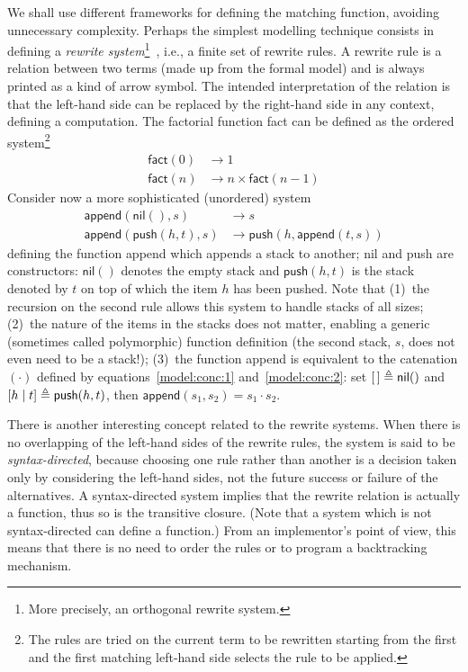 We shall use different frameworks for defining the matching function,
avoiding unnecessary complexity. Perhaps the simplest modelling
technique consists in defining a \emph{rewrite system}\footnote{More
precisely, an orthogonal rewrite system.}~\cite{HTCS:1990}, i.e., a
finite set of rewrite rules. A rewrite rule is a relation between two
terms (made up from the formal model) and is always printed as a kind
of arrow symbol. The intended interpretation of the relation is that
the left\hyp{}hand side can be replaced by the right\hyp{}hand side in
any context, defining a computation. The factorial function
\textsf{fact} can be defined as the ordered system\footnote{The rules
are tried on the current term to be rewritten starting from the first
and the first matching left\hyp{}hand side selects the rule to be
applied.}
\begin{align*}
\textsf{fact}(0) &\rightarrow 1\\
\textsf{fact}(n) &\rightarrow n \times \textsf{fact}(n-1)
\end{align*}
Consider now a more sophisticated (unordered) system
\begin{align*}
\textsf{append}(\textsf{nil}(), s) &\rightarrow s\\
\textsf{append}(\textsf{push}(h,t), s) &\rightarrow
\textsf{push}(h, \textsf{append}(t, s))
\end{align*}
defining the function \textsf{append} which appends a stack to
another; \textsf{nil} and \textsf{push} are constructors:
\(\textsf{nil}()\) denotes the empty stack and \(\textsf{push}(h, t)\)
is the stack denoted by \(t\) on top of which the item \(h\) has been
pushed. Note that (1)~the recursion on the second rule allows this
system to handle stacks of all sizes; (2)~the nature of the items in
the stacks does not matter, enabling a generic (sometimes called
polymorphic) function definition (the second stack, \(s\), does not
even need to be a stack!); (3)~the function \textsf{append} is
equivalent to the catenation \((\cdot)\) defined by
equations~\eqref{model:conc:1} and~\eqref{model:conc:2}: set \([\,]
\triangleq \textsf{nil}()\) and \([{h}\mid{t}] \triangleq
\textsf{push}(h, t)\), then \(\textsf{append}(s_1, s_2) = s_1 \cdot
s_2\).

There is another interesting concept related to the rewrite
systems. When there is no overlapping of the left\hyp{}hand sides of
the rewrite rules, the system is said to be
\emph{syntax\hyp{}directed}, because choosing one rule rather than
another is a decision taken only by considering the left\hyp{}hand
sides, not the future success or failure of the alternatives. A
syntax\hyp{}directed system implies that the rewrite relation is
actually a function, thus so is the transitive closure. (Note that a
system which is not syntax\hyp{}directed can define a function.) From
an implementor's point of view, this means that there is no need to
order the rules or to program a backtracking mechanism.


